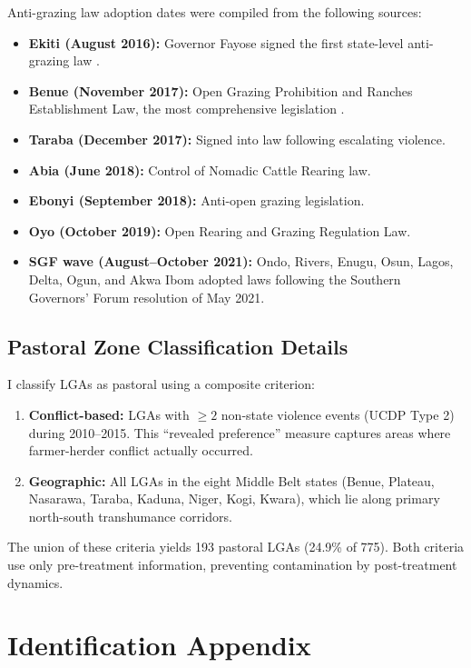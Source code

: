 \documentclass[12pt]{article}
\begin{document}
Anti-grazing law adoption dates were compiled from the following sources:
\begin{itemize}
\item \textbf{Ekiti (August 2016):} Governor Fayose signed the first state-level anti-grazing law \citep{ajala2020anti}.
\item \textbf{Benue (November 2017):} Open Grazing Prohibition and Ranches Establishment Law, the most comprehensive legislation \citep{ochonu2022anti}.
\item \textbf{Taraba (December 2017):} Signed into law following escalating violence.
\item \textbf{Abia (June 2018):} Control of Nomadic Cattle Rearing law.
\item \textbf{Ebonyi (September 2018):} Anti-open grazing legislation.
\item \textbf{Oyo (October 2019):} Open Rearing and Grazing Regulation Law.
\item \textbf{SGF wave (August--October 2021):} Ondo, Rivers, Enugu, Osun, Lagos, Delta, Ogun, and Akwa Ibom adopted laws following the Southern Governors' Forum resolution of May 2021.
\end{itemize}



\subsection{Pastoral Zone Classification Details}

I classify LGAs as pastoral using a composite criterion:
\begin{enumerate}
\item \textbf{Conflict-based:} LGAs with $\geq 2$ non-state violence events (UCDP Type 2) during 2010--2015. This ``revealed preference'' measure captures areas where farmer-herder conflict actually occurred.
\item \textbf{Geographic:} All LGAs in the eight Middle Belt states (Benue, Plateau, Nasarawa, Taraba, Kaduna, Niger, Kogi, Kwara), which lie along primary north-south transhumance corridors.
\end{enumerate}

The union of these criteria yields 193 pastoral LGAs (24.9\% of 775). Both criteria use only pre-treatment information, preventing contamination by post-treatment dynamics.

\section{Identification Appendix}
\end{document}
